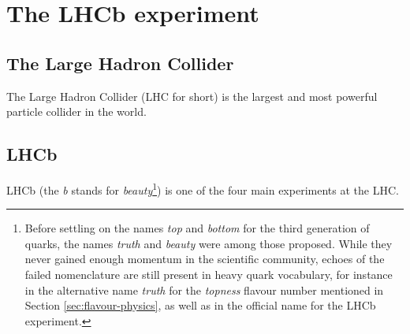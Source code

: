 \chapter{The LHCb experiment}
\label{cap:LHCb}

\section{The Large Hadron Collider}
The Large Hadron Collider (LHC for short) is the largest and most powerful particle collider in the world.

\section{LHCb}
LHCb (the \textit{b} stands for \textit{beauty}\footnote{Before settling on the names \textit{top} and \textit{bottom} for the third generation of quarks, the names \textit{truth} and \textit{beauty} were among those proposed. While they never gained enough momentum in the scientific community, echoes of the failed nomenclature are still present in heavy quark vocabulary, for instance in the alternative name \textit{truth} for the \textit{topness} flavour number mentioned in Section \ref{sec:flavour-physics}, as well as in the official name for the LHCb experiment.}) is one of the four main experiments at the LHC.
